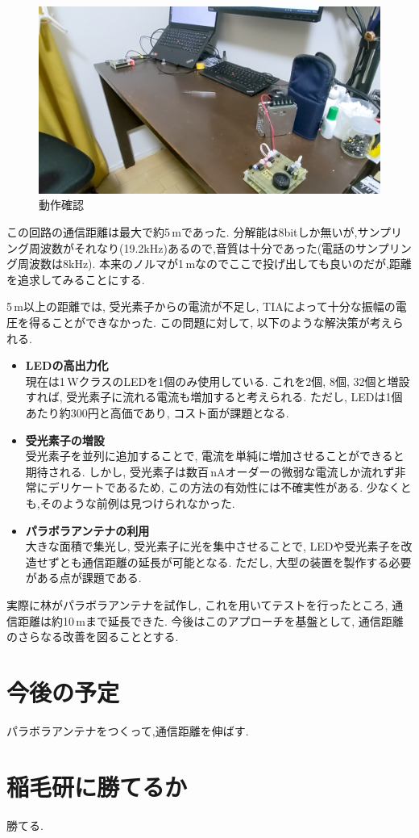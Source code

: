 \documentclass[a4paper,10pt]{article}
\begin{document}
\begin{multicols}{2}[\raggedcolumns]
\begin{figure}[H]
    \centering
    \includegraphics[width=0.7\linewidth]{figure/check.png} 
    \caption{動作確認} 
    \label{fig:check}
\end{figure}

この回路の通信距離は最大で約5\,mであった.
分解能は8bitしか無いが,サンプリング周波数がそれなり(19.2kHz)あるので,音質は十分であった(電話のサンプリング周波数は8kHz).
本来のノルマが1\,mなのでここで投げ出しても良いのだが,距離を追求してみることにする.

5\,m以上の距離では, 受光素子からの電流が不足し, TIAによって十分な振幅の電圧を得ることができなかった.  
この問題に対して, 以下のような解決策が考えられる.
\begin{itemize}
\item
  \textbf{LEDの高出力化}\\
  現在は1\,WクラスのLEDを1個のみ使用している.  
  これを2個, 8個, 32個と増設すれば, 受光素子に流れる電流も増加すると考えられる.  
  ただし, LEDは1個あたり約300円と高価であり, コスト面が課題となる.  

\item
  \textbf{受光素子の増設}\\
  受光素子を並列に追加することで, 電流を単純に増加させることができると期待される.  
  しかし, 受光素子は数百\,nAオーダーの微弱な電流しか流れず非常にデリケートであるため, この方法の有効性には不確実性がある.
  少なくとも,そのような前例は見つけられなかった.

\item
  \textbf{パラボラアンテナの利用}\\
  大きな面積で集光し, 受光素子に光を集中させることで, LEDや受光素子を改造せずとも通信距離の延長が可能となる.  
  ただし, 大型の装置を製作する必要がある点が課題である.  
\end{itemize}

実際に林がパラボラアンテナを試作し, これを用いてテストを行ったところ, 通信距離は約10\,mまで延長できた.  
今後はこのアプローチを基盤として, 通信距離のさらなる改善を図ることとする.

\section{今後の予定}
パラボラアンテナをつくって,通信距離を伸ばす.

\section{稲毛研に勝てるか}
勝てる.


\vfill
\end{multicols}
\end{document}
